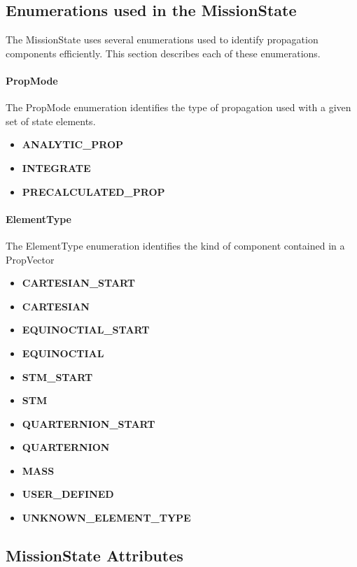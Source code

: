\subsection{Enumerations used in the MissionState}

The MissionState uses several enumerations used to identify propagation components efficiently.
This section describes each of these enumerations.

\paragraph{PropMode}  The PropMode enumeration identifies the type of propagation used with a given
set of state elements.

\begin{itemize}
\item \textbf{ANALYTIC\_PROP}
\item \textbf{INTEGRATE}
\item \textbf{PRECALCULATED\_PROP}
\end{itemize}

\paragraph{ElementType}  The ElementType enumeration identifies the kind of component contained in
a PropVector

\begin{itemize}
\item \textbf{CARTESIAN\_START}
\item \textbf{CARTESIAN}
\item \textbf{EQUINOCTIAL\_START}
\item \textbf{EQUINOCTIAL}
\item \textbf{STM\_START}
\item \textbf{STM}
\item \textbf{QUARTERNION\_START}
\item \textbf{QUARTERNION}
\item \textbf{MASS}
\item \textbf{USER\_DEFINED}
\item \textbf{UNKNOWN\_ELEMENT\_TYPE}
\end{itemize}

\subsection{MissionState Attributes}

